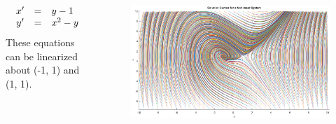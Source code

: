 \documentclass{beamer}
\begin{document}
\begin{frame}
    \begin{columns}[T]
        \begin{column}{0.2\textwidth}
            \begin{center}
            \[
                \begin{array}{c c l}
                    x' & = & y - 1 \\
                    y' & = & x^2 - y \\
                \end{array}
            \]
            These equations can be linearized about (-1, 1) and (1, 1).
            \end{center}
        \end{column}
        \begin{column}{0.8\textwidth}  %
            \begin{center}
                \begin{figure}
                    \includegraphics[width=1\linewidth]{NonlinearSystem}
                \end{figure}
            \end{center}
        \end{column}
    \end{columns}

\end{frame}

\end{document}
